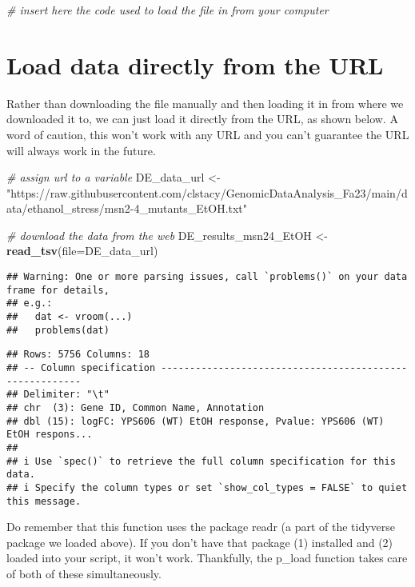 \documentclass[
]{book}
\newenvironment{Shaded}{\begin{snugshade}}{\end{snugshade}}
\newcommand{\AttributeTok}[1]{\textcolor[rgb]{0.13,0.29,0.53}{#1}}
\newcommand{\CommentTok}[1]{\textcolor[rgb]{0.56,0.35,0.01}{\textit{#1}}}
\newcommand{\FunctionTok}[1]{\textcolor[rgb]{0.13,0.29,0.53}{\textbf{#1}}}
\newcommand{\NormalTok}[1]{#1}
\newcommand{\OtherTok}[1]{\textcolor[rgb]{0.56,0.35,0.01}{#1}}
\newcommand{\StringTok}[1]{\textcolor[rgb]{0.31,0.60,0.02}{#1}}
\theoremstyle{definition}
\theoremstyle{definition}
\theoremstyle{definition}
\theoremstyle{definition}
\theoremstyle{remark}
\begin{document}
\begin{Shaded}
\begin{Highlighting}[]
\CommentTok{\# insert here the code used to load the file in from your computer}
\end{Highlighting}
\end{Shaded}

\hypertarget{load-data-directly-from-the-url}{%
\section{Load data directly from the URL}\label{load-data-directly-from-the-url}}

Rather than downloading the file manually and then loading it in from where we downloaded it to, we can just load it directly from the URL, as shown below. A word of caution, this won't work with any URL and you can't guarantee the URL will always work in the future.

\begin{Shaded}
\begin{Highlighting}[]
\CommentTok{\# assign url to a variable}
\NormalTok{DE\_data\_url }\OtherTok{\textless{}{-}} \StringTok{"https://raw.githubusercontent.com/clstacy/GenomicDataAnalysis\_Fa23/main/data/ethanol\_stress/msn2{-}4\_mutants\_EtOH.txt"}

\CommentTok{\# download the data from the web}
\NormalTok{DE\_results\_msn24\_EtOH }\OtherTok{\textless{}{-}}
  \FunctionTok{read\_tsv}\NormalTok{(}\AttributeTok{file=}\NormalTok{DE\_data\_url)}
\end{Highlighting}
\end{Shaded}

\begin{verbatim}
## Warning: One or more parsing issues, call `problems()` on your data frame for details,
## e.g.:
##   dat <- vroom(...)
##   problems(dat)
\end{verbatim}

\begin{verbatim}
## Rows: 5756 Columns: 18
## -- Column specification --------------------------------------------------------
## Delimiter: "\t"
## chr  (3): Gene ID, Common Name, Annotation
## dbl (15): logFC: YPS606 (WT) EtOH response, Pvalue: YPS606 (WT) EtOH respons...
## 
## i Use `spec()` to retrieve the full column specification for this data.
## i Specify the column types or set `show_col_types = FALSE` to quiet this message.
\end{verbatim}

Do remember that this function uses the package readr (a part of the tidyverse package we loaded above). If you don't have that package (1) installed and (2) loaded into your script, it won't work. Thankfully, the p\_load function takes care of both of these simultaneously.
\end{document}
